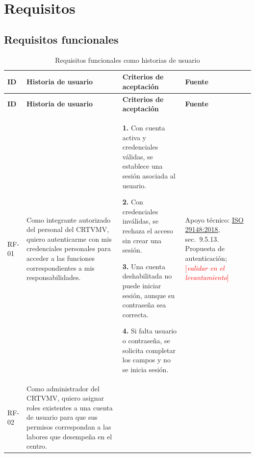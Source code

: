 \documentclass[11pt,a4paper]{article}
\newcommand{\pendiente}[1]{\textcolor{red}{[\textit{#1}]}}
\begin{document}
\section{Requisitos}

\subsection{Requisitos funcionales}

\begin{xltabular}{\textwidth}{lL{4.2cm}XL{2cm}}
  \caption{Requisitos funcionales como historias de usuario}\label{tab:rf}\\
  \toprule
  \textbf{ID} & \textbf{Historia de usuario} & \textbf{Criterios de aceptación} & \textbf{Fuente} \\
  \midrule
  \endfirsthead
  \toprule
  \textbf{ID} & \textbf{Historia de usuario} & \textbf{Criterios de aceptación} & \textbf{Fuente} \\
  \midrule
  \endhead
  \bottomrule
  \endfoot
  RF-01 & Como integrante autorizado del personal del CRTVMV, quiero autenticarme con mis credenciales personales para acceder a las funciones correspondientes a mis responsabilidades. &
  \textbf{1.} Con cuenta activa y credenciales válidas, se establece una sesión asociada al usuario.\par
  \textbf{2.} Con credenciales inválidas, se rechaza el acceso sin crear una sesión.\par
  \textbf{3.} Una cuenta deshabilitada no puede iniciar sesión, aunque su contraseña sea correcta.\par
  \textbf{4.} Si falta usuario o contraseña, se solicita completar los campos y no se inicia sesión. &
  Apoyo técnico: \href{https://github.com/NixonPiguave/TA-PFC-E1-PFC-Entrega-1/blob/be245df8f15b1183f94bada0679adc18146016cd/docs/Anexos/Estado\%20del\%20arte/ISO-IEC-IEEE\%2029148.pdf\#page=74}{ISO 29148:2018}, sec.~9.5.13. Propuesta de autenticación; \pendiente{validar en el levantamiento} \\
  RF-02 & Como administrador del CRTVMV, quiero asignar roles existentes a una cuenta de usuario para que sus permisos correspondan a las labores que desempeña en el centro. &

\end{xltabular}
\end{document}
